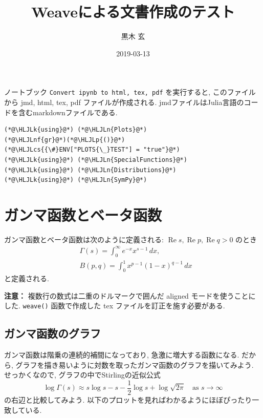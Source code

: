 \documentclass[12pt,a4paper,xelatex,ja=standard]{bxjsarticle}
\title{\bfseries Weaveによる文書作成のテスト }
\author{ 黒木 玄 }
\date{ 2019-03-13 }
\newcommand{\HLJLk}[1]{\textcolor[RGB]{148,91,176}{\textbf{#1}}}
\newcommand{\HLJLn}[1]{#1}
\newcommand{\HLJLnf}[1]{\textcolor[RGB]{66,102,213}{#1}}
\newcommand{\HLJLp}[1]{#1}
\newcommand{\HLJLcs}[1]{\textcolor[RGB]{153,153,119}{\textit{#1}}}
\newcommand\real{\operatorname{Re}}
\begin{document}
\maketitle

\tableofcontents

ノートブック \texttt{Convert ipynb to html, tex, pdf} を実行すると, このファイルから jmd, html, tex, pdf ファイルが作成される.  jmdファイルはJulia言語のコードを含むmarkdownファイルである.


\begin{lstlisting}
(*@\HLJLk{using}@*) (*@\HLJLn{Plots}@*)
(*@\HLJLnf{gr}@*)(*@\HLJLp{()}@*)
(*@\HLJLcs{{\#}ENV["PLOTS{\_}TEST"] = "true"}@*)
(*@\HLJLk{using}@*) (*@\HLJLn{SpecialFunctions}@*)
(*@\HLJLk{using}@*) (*@\HLJLn{Distributions}@*)
(*@\HLJLk{using}@*) (*@\HLJLn{SymPy}@*)
\end{lstlisting}


\section{ガンマ函数とベータ函数}
ガンマ函数とベータ函数は次のように定義される: $\real s, \real p, \real q > 0$ のとき
\[
\begin{aligned}
&
\Gamma(s) = \int_0^\infty e^{-x} x^{s-1}\,dx,
\\ &
B(p,q) = \int_0^1 x^{p-1} (1-x)^{q-1}\,dx
\end{aligned}
\]
と定義される. 

\textbf{注意：} 複数行の数式は二重のドルマークで囲んだ aligned モードを使うことにした. \texttt{weave()} 函数で作成した tex ファイルを訂正を施す必要がある.

\subsection{ガンマ函数のグラフ}
ガンマ函数は階乗の連続的補間になっており, 急激に増大する函数になる. だから, グラフを描き易いように対数を取ったガンマ函数のグラフを描いてみよう. せっかくなので, グラフの中でStirlingの近似公式
\[
\log\Gamma(s) \approx s \log s - s - \frac{1}{2}\log s + \log\sqrt{2\pi}
\quad\text{as $s\to\infty$}
\]
の右辺と比較してみよう. 以下のプロットを見ればわかるようにほぼぴったり一致している.
\end{document}
